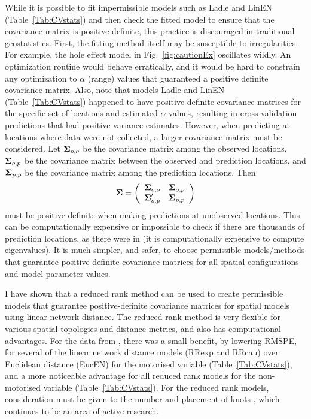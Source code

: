 \documentclass[11pt, titlepage]{article}\usepackage[]{graphicx}\usepackage[]{color}
\begin{document}
\begin{spacing}{1.9}
\begin{flushleft}
While it is possible to fit impermissible models such as Ladle and LinEN (Table~\ref{Tab:CVstats}) and then check the fitted model to ensure that the covariance matrix is positive definite, this practice is discouraged in traditional geostatistics.  First, the fitting method itself may be susceptible to irregularities. For example, the hole effect model in Fig.~\ref{fig:cautionEx} oscillates wildly.  An optimization routine would behave erratically, and it would be hard to constrain any optimization to $\alpha$ (range) values that guaranteed a positive definite covariance matrix.  Also, note that models Ladle and LinEN (Table~\ref{Tab:CVstats}) happened to have positive definite covariance matrices for the specific set of locations and estimated $\alpha$ values, resulting in cross-validation predictions that had positive variance estimates.  However, when predicting at locations where data were not collected, a larger covariance matrix must be considered.  Let $\mbox{\boldmath $\Sigma$}_{o,o}$ be the covariance matrix among the observed locations, $\mbox{\boldmath $\Sigma$}_{o,p}$ be the covariance matrix between the observed and prediction locations, and $\mbox{\boldmath $\Sigma$}_{p,p}$  be the covariance matrix among the prediction locations. Then
\[
				\mbox{\boldmath $\Sigma$} = \left(
					\begin{array}{cc}
									\mbox{\boldmath $\Sigma$}_{o,o} & \mbox{\boldmath $\Sigma$}_{o,p} \\
									\mbox{\boldmath $\Sigma$}_{o,p}^{\prime} & \mbox{\boldmath $\Sigma$}_{p,p}
					\end{array}
				\right)
\]
must be positive definite when making predictions at unobserved locations. This can be computationally expensive or impossible to check if there are thousands of prediction locations, as there were in \citet{Ladl:Avga:Whea:Boyc:pred:2016} (it is computationally expensive to compute eigenvalues). It is much simpler, and safer, to choose permissible models/methods that guarantee positive definite covariance matrices for all spatial configurations and model parameter values. 

I have shown that a reduced rank method can be used to create permissible models that guarantee positive-definite covariance matrices for spatial models using linear network distance.  The reduced rank method is very flexible for various spatial topologies and distance metrics, and also has computational advantages.  For the data from \citet{Ladl:Avga:Whea:Boyc:pred:2016}, there was a small benefit, by lowering RMSPE, for several of the linear network distance models (RRexp and RRcau) over Euclidean distance (EucEN) for the motorised variable (Table~\ref{Tab:CVstats}), and a more noticeable advantage for all reduced rank models for the non-motorised variable (Table~\ref{Tab:CVstats}).  For the reduced rank models, consideration must be given to the number and placement of knots \citep{Rupp:Wand:Carr:semi:2003, Gelf:Bane:Finl:spat:2012}, which continues to be an area of active research.


\end{flushleft}
\end{spacing}
\end{document}

